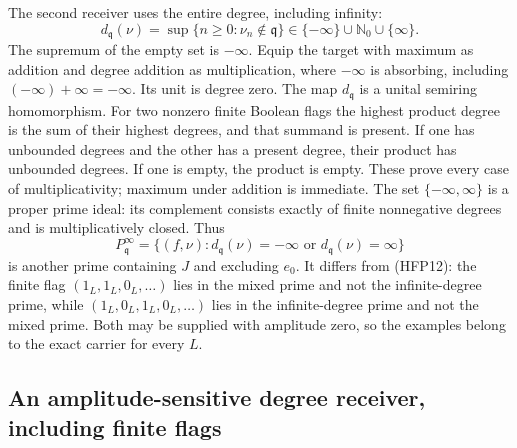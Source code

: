 The second receiver uses the entire degree, including infinity:
\begin{equation}\tag{HFP13}
 d_{\mathfrak q}(\nu)=\sup\{n\ge0:\nu_n\notin\mathfrak q\}
          \in\{-\infty\}\cup\mathbb N_0\cup\{\infty\}.
\end{equation}
The supremum of the empty set is $-\infty$. Equip the target
with maximum as addition and degree addition as multiplication,
where $-\infty$ is absorbing, including
$(-\infty)+\infty=-\infty$. Its unit is degree zero.
The map $d_{\mathfrak q}$ is a unital semiring homomorphism.
For two nonzero finite Boolean flags the highest product
degree is the sum of their highest degrees, and that summand
is present. If one has unbounded degrees and the other has
a present degree, their product has unbounded degrees.
If one is empty, the product is empty. These prove every
case of multiplicativity; maximum under addition is immediate.
The set $\{-\infty,\infty\}$ is a proper prime ideal:
its complement consists exactly of finite nonnegative degrees
and is multiplicatively closed. Thus
\begin{equation}\tag{HFP14}
 P^{\infty}_{\mathfrak q}
   =\{(f,\nu):d_{\mathfrak q}(\nu)=-\infty
                        \text{ or }d_{\mathfrak q}(\nu)=\infty\}
\end{equation}
is another prime containing $J$ and excluding $e_0$.
It differs from (HFP12): the finite flag
$(1_L,1_L,0_L,\ldots)$ lies in the mixed prime and not the
infinite-degree prime, while $(1_L,0_L,1_L,0_L,\ldots)$
lies in the infinite-degree prime and not the mixed prime.
Both may be supplied with amplitude zero, so the examples
belong to the exact carrier for every $L$.

\subsection{An amplitude-sensitive degree receiver, including finite flags}

